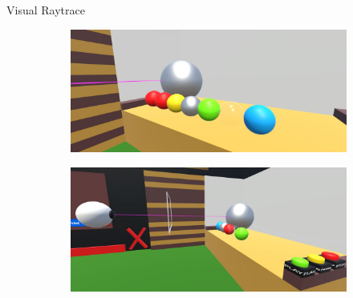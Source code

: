 \documentclass[final,hyperref={pdfpagelabels=false}]{beamer}
\begin{document}
\begin{frame}[t]
\begin{columns}[t]
\begin{column}{.96\textwidth}
\begin{block}{Visual Raytrace}
\begin{figure}
        \begin{subfigure}[b]{0.49\textwidth}
        \includegraphics[width=\textwidth]{duringProcessHitObjects}
        \end{subfigure}%
        \hfill%
        \begin{subfigure}[b]{0.49\textwidth}
        \includegraphics[width=\textwidth]{vorgang}            	   
    	\end{subfigure}
    
    \end{figure}

 

\end{block}
\end{column}
\end{columns}
\end{frame}
\end{document}
